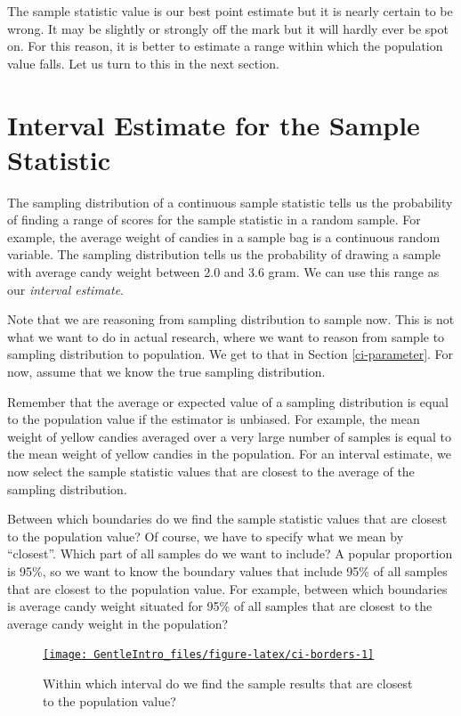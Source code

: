 \documentclass[a4paper]{book}
\theoremstyle{definition}
\theoremstyle{definition}
\theoremstyle{definition}
\theoremstyle{remark}
\begin{document}
The sample statistic value is our best point estimate but it is nearly
certain to be wrong. It may be slightly or strongly off the mark but it
will hardly ever be spot on. For this reason, it is better to estimate a
range within which the population value falls. Let us turn to this in
the next section.

\section{Interval Estimate for the Sample
Statistic}\label{interval-estimate-for-the-sample-statistic}

The sampling distribution of a continuous sample statistic tells us the
probability of finding a range of scores for the sample statistic in a
random sample. For example, the average weight of candies in a sample
bag is a continuous random variable. The sampling distribution tells us
the probability of drawing a sample with average candy weight between
2.0 and 3.6 gram. We can use this range as our \emph{interval estimate}.

Note that we are reasoning from sampling distribution to sample now.
This is not what we want to do in actual research, where we want to
reason from sample to sampling distribution to population. We get to
that in Section \ref{ci-parameter}. For now, assume that we know the
true sampling distribution.

Remember that the average or expected value of a sampling distribution
is equal to the population value if the estimator is unbiased. For
example, the mean weight of yellow candies averaged over a very large
number of samples is equal to the mean weight of yellow candies in the
population. For an interval estimate, we now select the sample statistic
values that are closest to the average of the sampling distribution.

Between which boundaries do we find the sample statistic values that are
closest to the population value? Of course, we have to specify what we
mean by ``closest''. Which part of all samples do we want to include? A
popular proportion is 95\%, so we want to know the boundary values that
include 95\% of all samples that are closest to the population value.
For example, between which boundaries is average candy weight situated
for 95\% of all samples that are closest to the average candy weight in
the population?

\begin{figure}[H]
\href{http://82.196.4.233:3838/apps/ci-borders/}{\texttt{[image: GentleIntro\_files/figure-latex/ci-borders-1]} }\caption{Within which interval do we find the sample results that are closest to the population value?}\label{fig:ci-borders}
\end{figure}
\end{document}
